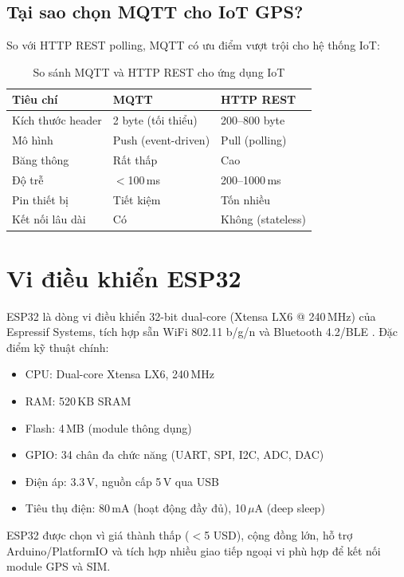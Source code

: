 \subsection{Tại sao chọn MQTT cho IoT GPS?}

So với HTTP REST polling, MQTT có ưu điểm vượt trội cho hệ thống IoT:

\begin{table}[H]
\centering
\caption{So sánh MQTT và HTTP REST cho ứng dụng IoT}
\label{tab:mqtt_vs_http}
\begin{tabularx}{\textwidth}{l X X}
\toprule
\textbf{Tiêu chí} & \textbf{MQTT} & \textbf{HTTP REST} \\
\midrule
Kích thước header & 2 byte (tối thiểu) & 200--800 byte \\
Mô hình & Push (event-driven) & Pull (polling) \\
Băng thông & Rất thấp & Cao \\
Độ trễ & $<$100\,ms & 200--1000\,ms \\
Pin thiết bị & Tiết kiệm & Tốn nhiều \\
Kết nối lâu dài & Có & Không (stateless) \\
\bottomrule
\end{tabularx}
\end{table}

\section{Vi điều khiển ESP32}

ESP32 là dòng vi điều khiển 32-bit dual-core (Xtensa LX6 @ 240\,MHz) của Espressif Systems, tích hợp sẵn WiFi 802.11 b/g/n và Bluetooth 4.2/BLE \cite{espressif2023esp32}. Đặc điểm kỹ thuật chính:

\begin{itemize}[noitemsep]
  \item CPU: Dual-core Xtensa LX6, 240\,MHz
  \item RAM: 520\,KB SRAM
  \item Flash: 4\,MB (module thông dụng)
  \item GPIO: 34 chân đa chức năng (UART, SPI, I2C, ADC, DAC)
  \item Điện áp: 3.3\,V, nguồn cấp 5\,V qua USB
  \item Tiêu thụ điện: 80\,mA (hoạt động đầy đủ), 10\,$\mu$A (deep sleep)
\end{itemize}

ESP32 được chọn vì giá thành thấp ($<$5 USD), cộng đồng lớn, hỗ trợ Arduino/PlatformIO và tích hợp nhiều giao tiếp ngoại vi phù hợp để kết nối module GPS và SIM.

